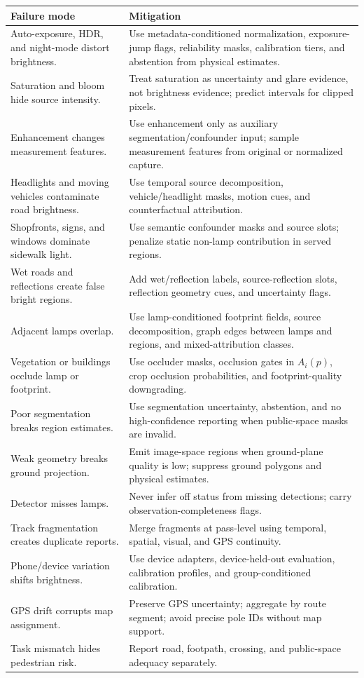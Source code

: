 \documentclass[11pt]{article}
\begin{document}
\begin{center}
\scriptsize
\begin{tabular}{p{}p{}}
\toprule
\textbf{Failure mode} & \textbf{Mitigation} \\
\midrule
Auto-exposure, HDR, and night-mode distort brightness. & Use metadata-conditioned normalization, exposure-jump flags, reliability masks, calibration tiers, and abstention from physical estimates. \\
Saturation and bloom hide source intensity. & Treat saturation as uncertainty and glare evidence, not brightness evidence; predict intervals for clipped pixels. \\
Enhancement changes measurement features. & Use enhancement only as auxiliary segmentation/confounder input; sample measurement features from original or normalized capture. \\
Headlights and moving vehicles contaminate road brightness. & Use temporal source decomposition, vehicle/headlight masks, motion cues, and counterfactual attribution. \\
Shopfronts, signs, and windows dominate sidewalk light. & Use semantic confounder masks and source slots; penalize static non-lamp contribution in served regions. \\
Wet roads and reflections create false bright regions. & Add wet/reflection labels, source-reflection slots, reflection geometry cues, and uncertainty flags. \\
Adjacent lamps overlap. & Use lamp-conditioned footprint fields, source decomposition, graph edges between lamps and regions, and mixed-attribution classes. \\
Vegetation or buildings occlude lamp or footprint. & Use occluder masks, occlusion gates in \(A_i(p)\), crop occlusion probabilities, and footprint-quality downgrading. \\
Poor segmentation breaks region estimates. & Use segmentation uncertainty, abstention, and no high-confidence reporting when public-space masks are invalid. \\
Weak geometry breaks ground projection. & Emit image-space regions when ground-plane quality is low; suppress ground polygons and physical estimates. \\
Detector misses lamps. & Never infer off status from missing detections; carry observation-completeness flags. \\
Track fragmentation creates duplicate reports. & Merge fragments at pass-level using temporal, spatial, visual, and GPS continuity. \\
Phone/device variation shifts brightness. & Use device adapters, device-held-out evaluation, calibration profiles, and group-conditioned calibration. \\
GPS drift corrupts map assignment. & Preserve GPS uncertainty; aggregate by route segment; avoid precise pole IDs without map support. \\
Task mismatch hides pedestrian risk. & Report road, footpath, crossing, and public-space adequacy separately. \\
\bottomrule
\end{tabular}
\end{center}
\end{document}
